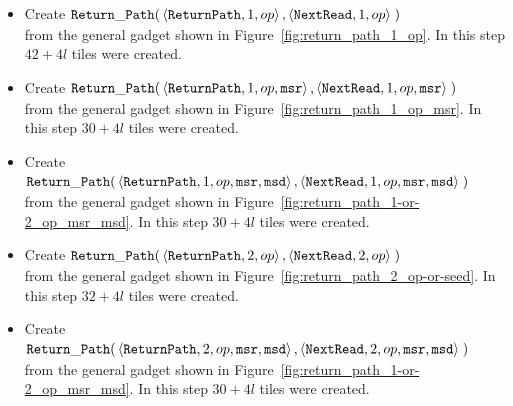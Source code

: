 \begin{itemize}

    \item Create
    $\begin{aligned}[t]
        {\tt Return\_Path}(& \left\langle {\tt ReturnPath}, 1, op \right\rangle,
                      \left\langle {\tt NextRead},   1, op \right\rangle \;)
    \end{aligned}$\\from the general gadget shown in Figure~\ref{fig:return_path_1_op}. In this step $42 + 4l$ tiles were created.

    \item Create
    $\begin{aligned}[t]
        {\tt Return\_Path}(& \left\langle {\tt ReturnPath}, 1, op, {\tt msr} \right\rangle,
                      \left\langle {\tt NextRead},   1, op, {\tt msr} \right\rangle \;)
    \end{aligned}$\\from the general gadget shown in Figure~\ref{fig:return_path_1_op_msr}. In this step $30 + 4l$ tiles were created.

    \item Create
    $\begin{aligned}[t]
        {\tt Return\_Path}(& \left\langle {\tt ReturnPath}, 1, op, {\tt msr}, {\tt msd} \right\rangle,
                      \left\langle {\tt NextRead},   1, op, {\tt msr}, {\tt msd} \right\rangle \;)
    \end{aligned}$\\from the general gadget shown in Figure~\ref{fig:return_path_1-or-2_op_msr_msd}. In this step $30 + 4l$ tiles were created.


    \item Create
    $\begin{aligned}[t]
        {\tt Return\_Path}(& \left\langle {\tt ReturnPath}, 2, op \right\rangle,
                      \left\langle {\tt NextRead},   2, op \right\rangle \;)
    \end{aligned}$\\from the general gadget shown in Figure~\ref{fig:return_path_2_op-or-seed}. In this step $32 + 4l$ tiles were created.

    \item Create
    $\begin{aligned}[t]
        {\tt Return\_Path}(& \left\langle {\tt ReturnPath}, 2, op, {\tt msr}, {\tt msd} \right\rangle,
                      \left\langle {\tt NextRead},   2, op, {\tt msr}, {\tt msd} \right\rangle \;)
    \end{aligned}$\\from the general gadget shown in Figure~\ref{fig:return_path_1-or-2_op_msr_msd}. In this step $30 + 4l$ tiles were created.



\end{itemize}
